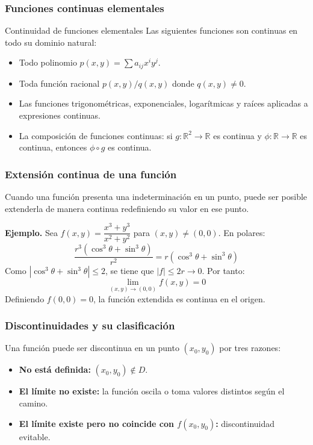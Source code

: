 \subsubsection{Funciones continuas elementales}

\begin{mytheorem}{Continuidad de funciones elementales}
Las siguientes funciones son continuas en todo su dominio natural:
\begin{itemize}
    \item Todo polinomio $p(x,y) = \sum a_{ij} x^i y^j$.
    \item Toda función racional $p(x,y)/q(x,y)$ donde $q(x,y) \neq 0$.
    \item Las funciones trigonométricas, exponenciales, logarítmicas y raíces aplicadas a expresiones continuas.
    \item La composición de funciones continuas: si $g: \mathbb{R}^2 \to \mathbb{R}$ es continua y $\phi: \mathbb{R} \to \mathbb{R}$ es continua, entonces $\phi \circ g$ es continua.
\end{itemize}
\end{mytheorem}

\subsubsection{Extensión continua de una función}

Cuando una función presenta una indeterminación en un punto, puede ser posible extenderla de manera continua redefiniendo su valor en ese punto.

\textbf{Ejemplo.} Sea $f(x,y) = \dfrac{x^3 + y^3}{x^2 + y^2}$ para $(x,y) \neq (0,0)$. En polares:
\[ \frac{r^3(\cos^3\theta + \sin^3\theta)}{r^2} = r(\cos^3\theta + \sin^3\theta) \]
Como $|\cos^3\theta + \sin^3\theta| \leq 2$, se tiene que $|f| \leq 2r \to 0$. Por tanto:
\[ \lim_{(x,y)\to(0,0)} f(x,y) = 0 \]
Definiendo $f(0,0) = 0$, la función extendida es continua en el origen.

\subsubsection{Discontinuidades y su clasificación}

Una función puede ser discontinua en un punto $(x_0, y_0)$ por tres razones:
\begin{itemize}
    \item \textbf{No está definida:} $(x_0,y_0) \notin D$.
    \item \textbf{El límite no existe:} la función oscila o toma valores distintos según el camino.
    \item \textbf{El límite existe pero no coincide con $f(x_0,y_0)$:} discontinuidad evitable.
\end{itemize}


